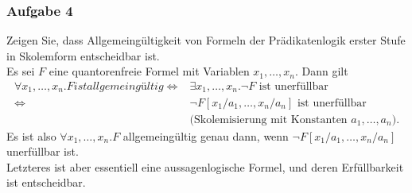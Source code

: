 \subsubsection*{Aufgabe 4}
Zeigen Sie, dass Allgemeingültigkeit von Formeln der Prädikatenlogik erster Stufe in Skolemform entscheidbar ist. \\
\LOES Es sei $F$ eine quantorenfreie Formel mit Variablen $x_1, \dots, x_n$. Dann gilt
\begin{align*}
\forall x_1, \dots, x_n. F ist allgemeingültig \Leftrightarrow & \exists x_1, \dots, x_n.\neg F \text{ ist unerfüllbar} \\
\Leftrightarrow & \neg F[x_1/a_1, \dots, x_n/a_n] \text{ ist unerfüllbar} \\
& \text{(Skolemisierung mit Konstanten } a_1, \dots, a_n \text{).}
\end{align*}
Es ist also $\forall x_1, \dots, x_n.F$ allgemeingültig genau dann, wenn $\neg F[x_1/a_1, \dots, x_n/a_n]$ unerfüllbar ist. \\
Letzteres ist aber essentiell eine aussagenlogische Formel, und deren Erfüllbarkeit ist entscheidbar.